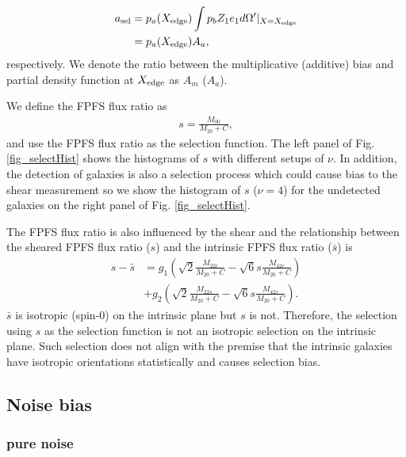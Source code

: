 \begin{equation}
\begin{split}
a_{\rm{sel}}&=p_a(X_{\rm{edge}}) \int p_b Z_1 e_1 d\Omega'|_{X=X_{\rm{edge}}} \\
            &=p_a(X_{\rm{edge}}) A_a,
\end{split}
\end{equation}
respectively. We denote the ratio between the multiplicative (additive) bias and partial density function
at $X_{\rm{edge}}$ as $A_{m}$ ($A_{a}$).

We define the FPFS flux ratio as
\begin{align}\label{select_define}
s = \frac{M_{00}}{M_{20}+C},
\end{align}
and use the FPFS flux ratio as the selection function.
The left panel of Fig. \ref{fig_selectHist} shows the histograms of $s$ with
different setups of $\nu$. In addition, the detection of galaxies is also a
selection process which could cause bias to the shear measurement so we show
the histogram of $s$ ($\nu=4$) for the undetected galaxies on the right panel
of Fig. \ref{fig_selectHist}.

The FPFS flux ratio is also influenced by the shear and the relationship
between the sheared FPFS flux ratio ($s$) and the intrinsic FPFS flux ratio
($\bar{s}$) is
\begin{align}\label{select_transform}
s-\bar{s} &=g_1 (\sqrt{2}\frac{M_{22c}}{M_{20}+C}
    -\sqrt{6}s\frac{M_{42c}}{M_{20}+C}) \\
    &+g_2 (\sqrt{2}\frac{M_{22s}}{M_{20}+C}
    -\sqrt{6}s\frac{M_{42s}}{M_{20}+C}).
\end{align}
$\bar{s}$ is isotropic (spin-0) on the intrinsic plane but $s$ is not.
Therefore, the selection using $s$ as the selection function is not an
isotropic selection on the intrinsic plane. Such selection does not align with
the premise that the intrinsic galaxies have isotropic orientations
statistically and causes selection bias.


\subsection{Noise bias}
\label{sec_Method_noise}

\subsubsection{pure noise}

